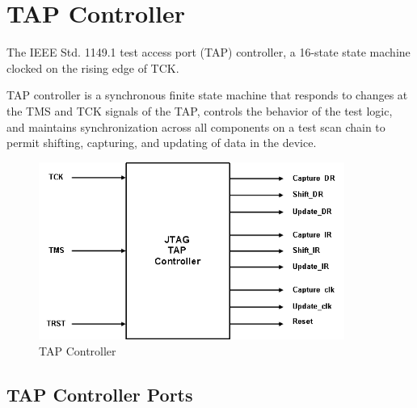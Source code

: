\newpage

\section{TAP Controller}
\label{sec:tap-controller}

The IEEE Std. 1149.1 test access port (TAP) controller, a 16-state state machine clocked on the rising edge of TCK. 

TAP controller is a synchronous finite state machine that responds to changes at the TMS and TCK signals of the TAP, controls the behavior of the test logic, and maintains synchronization across all components on a test scan chain to permit shifting, capturing, and updating of data in the device.

\vspace{1cm}
\begin{figure}[H]
    \centering
    \includegraphics[width = 10cm]{images/jtag_tap_controller.png}
    \vspace{1cm}
    \caption{TAP Controller}
    \label{fig:tap-controller}
\end{figure}

\subsection{TAP Controller Ports}
\label{subsec:tap-controller-ports}

